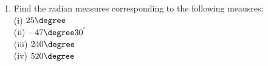 \begin{enumerate}[label=\arabic*.,ref=\thesubsection.\theenumi]
%
%
%
%
%
%
%
%
%
%
%
%
%
%	
%
%
%
%
%
%
%
%
\item Find the radian measures corresponding to the following meausres:\\
(i) $25\degree $\\
(ii) $-47\degree 30^{'}$\\
(iii) $240\degree$\\
(iv) $520\degree$


\end{enumerate}
